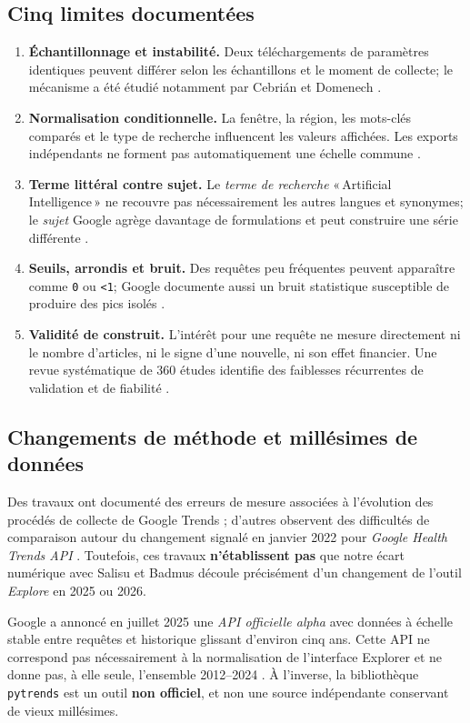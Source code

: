 \documentclass[11pt,a4paper]{article}
\begin{document}
\subsection{Cinq limites documentées}
\begin{enumerate}
\item \textbf{Échantillonnage et instabilité.} Deux téléchargements de paramètres identiques peuvent différer selon les échantillons et le moment de collecte; le mécanisme a été étudié notamment par Cebrián et Domenech \cite{Cebrian2024}.
\item \textbf{Normalisation conditionnelle.} La fenêtre, la région, les mots-clés comparés et le type de recherche influencent les valeurs affichées. Les exports indépendants ne forment pas automatiquement une échelle commune \cite{GoogleFAQ,GoogleTerms}.
\item \textbf{Terme littéral contre sujet.} Le \emph{terme de recherche} «\,Artificial Intelligence\,» ne recouvre pas nécessairement les autres langues et synonymes; le \emph{sujet} Google agrège davantage de formulations et peut construire une série différente \cite{GoogleTerms}.
\item \textbf{Seuils, arrondis et bruit.} Des requêtes peu fréquentes peuvent apparaître comme \texttt{0} ou \texttt{<1}; Google documente aussi un bruit statistique susceptible de produire des pics isolés \cite{GoogleFAQ}.
\item \textbf{Validité de construit.} L'intérêt pour une requête ne mesure directement ni le nombre d'articles, ni le signe d'une nouvelle, ni son effet financier. Une revue systématique de 360 études identifie des faiblesses récurrentes de validation et de fiabilité \cite{Misuse2025}.
\end{enumerate}

\subsection{Changements de méthode et millésimes de données}
Des travaux ont documenté des erreurs de mesure associées à l'évolution des procédés de collecte de Google Trends \cite{Liu2024}; d'autres observent des difficultés de comparaison autour du changement signalé en janvier 2022 pour \textit{Google Health Trends API} \cite{Health2022}. Toutefois, ces travaux \textbf{n'établissent pas} que notre écart numérique avec Salisu et Badmus découle précisément d'un changement de l'outil \emph{Explore} en 2025 ou 2026.

Google a annoncé en juillet 2025 une \emph{API officielle alpha} avec données à échelle stable entre requêtes et historique glissant d'environ cinq ans. Cette API ne correspond pas nécessairement à la normalisation de l'interface Explorer et ne donne pas, à elle seule, l'ensemble 2012--2024 \cite{GoogleAPI2025}. À l'inverse, la bibliothèque \texttt{pytrends} est un outil \textbf{non officiel}, et non une source indépendante conservant de vieux millésimes.
\end{document}
